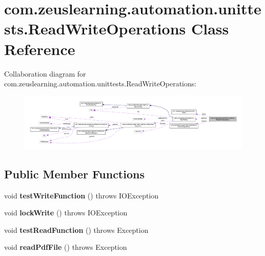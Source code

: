 \hypertarget{classcom_1_1zeuslearning_1_1automation_1_1unittests_1_1ReadWriteOperations}{}\section{com.\+zeuslearning.\+automation.\+unittests.\+Read\+Write\+Operations Class Reference}
\label{classcom_1_1zeuslearning_1_1automation_1_1unittests_1_1ReadWriteOperations}


Collaboration diagram for com.\+zeuslearning.\+automation.\+unittests.\+Read\+Write\+Operations\+:
\nopagebreak
\begin{figure}[H]
\begin{center}
\leavevmode
\includegraphics[width=350pt]{db/db4/classcom_1_1zeuslearning_1_1automation_1_1unittests_1_1ReadWriteOperations__coll__graph}
\end{center}
\end{figure}
\subsection*{Public Member Functions}
\begin{DoxyCompactItemize}
\item 
\hypertarget{classcom_1_1zeuslearning_1_1automation_1_1unittests_1_1ReadWriteOperations_a77f6b2ff827f856c8f7c1fb7bc059fa9}{}\label{classcom_1_1zeuslearning_1_1automation_1_1unittests_1_1ReadWriteOperations_a77f6b2ff827f856c8f7c1fb7bc059fa9} 
void {\bfseries test\+Write\+Function} ()  throws I\+O\+Exception 
\item 
\hypertarget{classcom_1_1zeuslearning_1_1automation_1_1unittests_1_1ReadWriteOperations_a6875d82f3c6d4037bd55ef8008f7c006}{}\label{classcom_1_1zeuslearning_1_1automation_1_1unittests_1_1ReadWriteOperations_a6875d82f3c6d4037bd55ef8008f7c006} 
void {\bfseries lock\+Write} ()  throws I\+O\+Exception 
\item 
\hypertarget{classcom_1_1zeuslearning_1_1automation_1_1unittests_1_1ReadWriteOperations_a1fce76d99de937f2d4b93d60e8f636ed}{}\label{classcom_1_1zeuslearning_1_1automation_1_1unittests_1_1ReadWriteOperations_a1fce76d99de937f2d4b93d60e8f636ed} 
void {\bfseries test\+Read\+Function} ()  throws Exception 
\item 
\hypertarget{classcom_1_1zeuslearning_1_1automation_1_1unittests_1_1ReadWriteOperations_a6effdf656351d8c1891b3b66b765d303}{}\label{classcom_1_1zeuslearning_1_1automation_1_1unittests_1_1ReadWriteOperations_a6effdf656351d8c1891b3b66b765d303} 
void {\bfseries read\+Pdf\+File} ()  throws Exception 
\end{DoxyCompactItemize}
